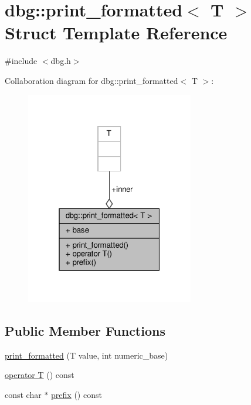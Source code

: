 \hypertarget{structdbg_1_1print__formatted}{}\section{dbg\+:\+:print\+\_\+formatted$<$ T $>$ Struct Template Reference}
\label{structdbg_1_1print__formatted}


{\ttfamily \#include $<$dbg.\+h$>$}



Collaboration diagram for dbg\+:\+:print\+\_\+formatted$<$ T $>$\+:\nopagebreak
\begin{figure}[H]
\begin{center}
\leavevmode
\includegraphics[width=208pt]{d0/d95/structdbg_1_1print__formatted__coll__graph}
\end{center}
\end{figure}
\subsection*{Public Member Functions}
\begin{DoxyCompactItemize}
\item 
\hyperlink{structdbg_1_1print__formatted_a77fef2b6aa871171bfefe58bab8a03fe}{print\+\_\+formatted} (T value, int numeric\+\_\+base)
\item 
\hyperlink{structdbg_1_1print__formatted_ab6a7c4280acb807f5c5ab812f80a8aca}{operator T} () const
\item 
const char $\ast$ \hyperlink{structdbg_1_1print__formatted_ab490d37d984d053177b6af3f94d0136e}{prefix} () const
\end{DoxyCompactItemize}
